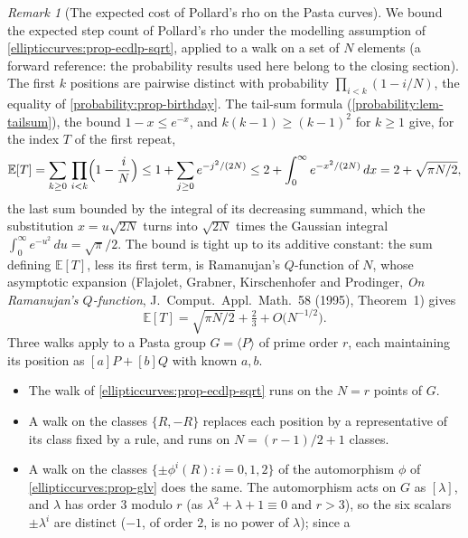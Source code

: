 \documentclass[11pt,a4paper]{article}
\theoremstyle{definition}
\theoremstyle{remark}
\newtheorem{remark}[theorem]{Remark}
\newcommand{\E}{\ensuremath{\mathbb{E}}}
\begin{document}
\begin{remark}[The expected cost of Pollard's rho on the Pasta curves]
\label{ellipticcurves:rem-pasta-rho}
We bound the expected step count of Pollard's rho under the modelling
assumption of \cref{ellipticcurves:prop-ecdlp-sqrt}, applied to a walk on
a set of \(N\) elements (a forward reference: the probability results used
here belong to the closing section). The first \(k\) positions are pairwise
distinct with probability \(\prod_{i<k}(1 - i/N)\), the equality of
\cref{probability:prop-birthday}. The tail-sum formula
(\cref{probability:lem-tailsum}), the bound \(1 - x \le e^{-x}\), and
\(k(k-1) \ge (k-1)^2\) for \(k \ge 1\) give, for the index \(T\) of the
first repeat,
\[
\E[T] = \sum_{k \ge 0}\, \prod_{i<k}\Bigl(1 - \frac{i}{N}\Bigr)
\le 1 + \sum_{j \ge 0} e^{-j^2/(2N)}
\le 2 + \int_0^\infty e^{-x^2/(2N)}\,dx
= 2 + \sqrt{\pi N/2} ,
\]
the last sum bounded by the integral of its decreasing summand, which the
substitution \(x = u\sqrt{2N}\) turns into \(\sqrt{2N}\) times the Gaussian
integral \(\int_0^\infty e^{-u^2}\,du = \sqrt\pi/2\). The bound is
tight up to its additive constant: the sum defining \(\E[T]\), less its
first term, is Ramanujan's \(Q\)-function of \(N\), whose asymptotic
expansion (Flajolet, Grabner, Kirschenhofer and Prodinger, \emph{On Ramanujan's
\(Q\)-function}, J.~Comput.\ Appl.\ Math.\ 58 (1995), Theorem~1) gives
\[
\E[T] = \sqrt{\pi N/2} + \tfrac23 + O\bigl(N^{-1/2}\bigr) .
\]
Three walks apply to a Pasta group \(G = \langle P \rangle\) of prime order
\(r\), each maintaining its position as \([a]P + [b]Q\) with known
\(a, b\).
\begin{itemize}
\item The walk of \cref{ellipticcurves:prop-ecdlp-sqrt} runs on the
  \(N = r\) points of \(G\).
\item A walk on the classes \(\{R, -R\}\) replaces each position by a
  representative of its class fixed by a rule, and runs on
  \(N = (r-1)/2 + 1\) classes.
\item A walk on the classes \(\{\pm\phi^i(R) : i = 0, 1, 2\}\) of the
  automorphism \(\phi\) of \cref{ellipticcurves:prop-glv} does the same.
  The automorphism acts on \(G\) as \([\lambda]\), and \(\lambda\) has
  order \(3\) modulo \(r\) (as \(\lambda^2 + \lambda + 1 \equiv 0\) and
  \(r > 3\)), so the six scalars \(\pm\lambda^i\) are
  distinct (\(-1\), of order \(2\), is no power of \(\lambda\)); since a

\end{itemize}
\end{remark}
\end{document}
